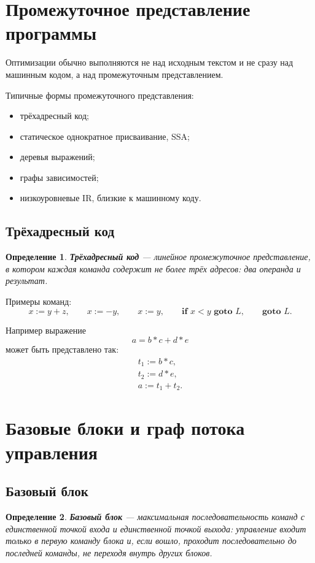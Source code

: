 \documentclass[12pt,a4paper]{article}
\newtheorem{definition}{Определение}
\begin{document}
\section{Промежуточное представление программы}

Оптимизации обычно выполняются не над исходным текстом и не сразу над машинным кодом, а над промежуточным представлением.

Типичные формы промежуточного представления:
\begin{itemize}
    \item трёхадресный код;
    \item статическое однократное присваивание, SSA;
    \item деревья выражений;
    \item графы зависимостей;
    \item низкоуровневые IR, близкие к машинному коду.
\end{itemize}

\subsection{Трёхадресный код}

\begin{definition}
\textbf{Трёхадресный код} --- линейное промежуточное представление, в котором каждая команда содержит не более трёх адресов: два операнда и результат.
\end{definition}

Примеры команд:
\[
x := y + z,
\qquad
x := -y,
\qquad
x := y,
\qquad
\textbf{if } x < y \textbf{ goto } L,
\qquad
\textbf{goto } L.
\]

Например выражение
\[
a = b * c + d * e
\]
может быть представлено так:
\[
\begin{array}{l}
t_1 := b * c,\\
t_2 := d * e,\\
a := t_1 + t_2.
\end{array}
\]

\section{Базовые блоки и граф потока управления}

\subsection{Базовый блок}

\begin{definition}
\textbf{Базовый блок} --- максимальная последовательность команд с единственной точкой входа и единственной точкой выхода: управление входит только в первую команду блока и, если вошло, проходит последовательно до последней команды, не переходя внутрь других блоков.
\end{definition}
\end{document}
